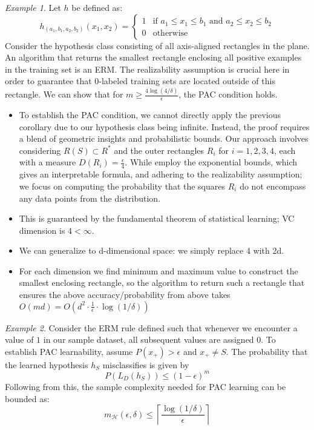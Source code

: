 \documentclass[11pt,reqno]{amsart}
\theoremstyle{remark}
\newtheorem{example}{Example}
\begin{document}
\begin{example}
Let \( h \) be defined as:
\[
h_{(a_1, b_1, a_2, b_2)}(x_1, x_2) = 
\begin{cases} 
1 & \text{if } a_1 \leq x_1 \leq b_1 \text{ and } a_2 \leq x_2 \leq b_2 \\
0 & \text{otherwise}
\end{cases}
\]
Consider the hypothesis class consisting of all axis-aligned rectangles in the plane.
An algorithm that returns the smallest rectangle enclosing all positive examples in the training set is an ERM. 
The realizability assumption is crucial here in order to guarantee that 0-labeled training sets are located outside of this rectangle. We can show that for $m\geq \frac{4\log(4/\delta)}\epsilon$, the PAC condition holds. 
\begin{itemize}
\item To establish the PAC condition, we cannot directly apply the previous corollary due to our hypothesis class being infinite. Instead, the proof requires a blend of geometric insights and probabilistic bounds. Our approach involves considering \( R(S) \subset R^* \) and the outer rectangles \( R_i \) for \( i = 1, 2, 3, 4 \), each with a measure \( D(R_i) = \frac{\epsilon}{4} \). While employ the exponential bounds, which gives an interpretable formula, and adhering to the realizability assumption; we focus on computing the probability that the squares \( R_i \) do not encompass any data points from the distribution.
\item This is guaranteed by the fundamental theorem of statistical learning; VC dimension is $4<\infty$.
\item We can generalize to d-dimensional space: we simply replace 4 with 2d.
\item For each dimension we find minimum and maximum value to construct the smallest enclosing rectangle, so the algorithm to return such a rectangle that ensures the above accuracy/probability 
from above takes $O(md)=O(d^2\cdot\frac 1\epsilon\cdot \log(1/\delta))$
\end{itemize}
\end{example}
\begin{example}
Consider the ERM rule defined such that whenever we encounter a value of \(1\) in our sample dataset, all subsequent values are assigned \(0\). To establish PAC learnability, assume \(P(x_+) > \epsilon\) and \(x_+ \neq S\). The probability that the learned hypothesis \(h_S\) misclassifies is given by 
\[ P(L_D(h_S)) \leq (1-\epsilon)^m \]
Following from this, the sample complexity needed for PAC learning can be bounded as:
\[ m_\mathcal{H}(\epsilon, \delta) \leq \left\lceil \frac{\log (1/\delta)}{\epsilon} \right\rceil \]
\end{example}
\end{document}
